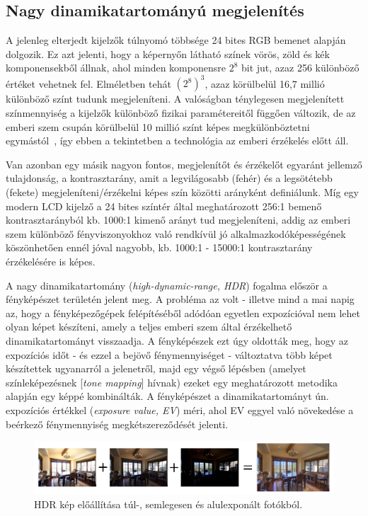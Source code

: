 \subsection{Nagy dinamikatartományú megjelenítés}

A jelenleg elterjedt kijelzők túlnyomó többsége 24 bites RGB bemenet alapján dolgozik. Ez azt jelenti, hogy a képernyőn látható színek vörös, zöld és kék komponensekből állnak, ahol minden komponensre \(2^8\) bit jut, azaz 256 különböző értéket vehetnek fel. Elméletben tehát \((2^8)^3\), azaz körülbelül 16,7 millió különböző színt tudunk megjeleníteni. A valóságban ténylegesen megjelenített színmennyiség a kijelzők különböző fizikai paramétereitől függően változik, de az emberi szem csupán körülbelül 10 millió színt képes megkülönböztetni egymástól~\cite{judd1975color}, így ebben a tekintetben a technológia az emberi érzékelés előtt áll.

Van azonban egy másik nagyon fontos, megjelenítőt és érzékelőt egyaránt jellemző tulajdonság, a kontrasztarány, amit a legvilágosabb (fehér) és a legsötétebb (fekete) megjeleníteni/érzékelni képes szín közötti arányként definiálunk. Míg egy modern LCD kijelző a 24 bites színtér által meghatározott 256:1 bemenő kontrasztarányból kb. 1000:1 kimenő arányt tud megjeleníteni, addig az emberi szem különböző fényviszonyokhoz való rendkívül jó alkalmazkodóképességének köszönhetően ennél jóval nagyobb, kb. 1000:1 - 15000:1 kontrasztarány érzékelésére is képes.~\cite{human_eye_dynamic_range}

A nagy dinamikatartomány (\textit{high-dynamic-range, HDR}) fogalma először a fényképészet területén jelent meg. A probléma az volt - illetve mind a mai napig az, hogy a fényképezőgépek felépítéséből adódóan egyetlen expozícióval nem lehet olyan képet készíteni, amely a teljes emberi szem által érzékelhető dinamikatartományt visszaadja. A fényképészek ezt úgy oldották meg, hogy az expozíciós időt - és ezzel a bejövő fénymennyiséget - változtatva több képet készítettek ugyanarról a jelenetről, majd egy végső lépésben (amelyet színleképezésnek [\textit{tone mapping}] hívnak) ezeket egy meghatározott metodika alapján egy képpé kombinálták. A fényképészet a dinamikatartományt ún. expozíciós értékkel (\textit{exposure value, EV}) méri, ahol EV eggyel való növekedése a beérkező fénymennyiség megkétszereződését jelenti.

\begin{figure}[!ht]
    \centering
    \includegraphics[width=1.0\textwidth]{images/hdr_process.png}
    \caption{HDR kép előállítása túl-, semlegesen és alulexponált fotókból.}
\end{figure}

